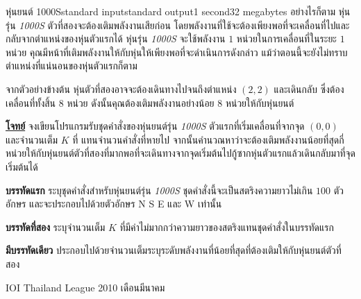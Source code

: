 \documentclass[11pt,a4paper]{article}
\begin{document}
\begin{problem}{หุ่นยนต์ 1000S}{standard input}{standard output}{1 second}{32 megabytes}
อย่างไรก็ตาม หุ่นรุ่น \textit{1000S} ตัวที่สองจะต้องเติมพลังงานเสียก่อน โดยพลังงานที่ใช้จะต้องเพียงพอที่จะเคลื่อนที่ไปและกลับจากตำแหน่งของหุ่นตัวแรกได้   หุ่นรุ่น \textit{1000S} จะใช้พลังงาน $1$ หน่วยในการเคลื่อนที่ในระยะ $1$ หน่วย   คุณมีหน้าที่เติมพลังงานให้กับหุ่นให้เพียงพอที่จะดำเนินการดังกล่าว แม้ว่าตอนนี้จะยังไม่ทราบตำแหน่งที่แน่นอนของหุ่นตัวแรกก็ตาม

จากตัวอย่างข้างต้น หุ่นตัวที่สองอาจจะต้องเดินทางไปจนถึงตำแหน่ง $(2,2)$ และเดินกลับ ซึ่งต้องเคลื่อนที่ทั้งสิ้น $8$ หน่วย ดังนั้นคุณต้องเติมพลังงานอย่างน้อย $8$ หน่วยให้กับหุ่นยนต์

\bigskip
\underline{\textbf{โจทย์}}  จงเขียนโปรแกรมรับชุดคำสั่งของหุ่นยนต์รุ่น \textit{1000S} ตัวแรกที่เริ่มเคลื่อนที่จากจุด $(0,0)$ และจำนวนเต็ม $K$ ที่ แทนจำนวนคำสั่งที่หายไป จากนั้นคำนวณหาว่าจะต้องเติมพลังงานน้อยที่สุดกี่หน่วยให้กับหุ่นยนต์ตัวที่สองที่มากพอที่จะเดินทางจากจุดเริ่มต้นไปกู้ซากหุ่นตัวแรกแล้วเดินกลับมาที่จุดเริ่มต้นได้


\InputFile

\textbf{บรรทัดแรก} ระบุชุดคำสั่งสำหรับหุ่นยนต์รุ่น \textit{1000S} ชุดคำสั่งนี้จะเป็นสตริงความยาวไม่เกิน $100$ ตัวอักษร และจะประกอบไปด้วยตัวอักษร N S E และ W เท่านั้น  

\textbf{บรรทัดที่สอง} ระบุจำนวนเต็ม $K$ ที่มีค่าไม่มากกว่าความยาวของสตริงแทนชุดคำสั่งในบรรทัดแรก


\OutputFile

\textbf{มีบรรทัดเดียว} ประกอบไปด้วยจำนวนเต็มระบุระดับพลังงานที่น้อยที่สุดที่ต้องเติมให้กับหุ่นยนต์ตัวที่สอง


\Examples

\begin{example}
%
%
%
\end{example}


\Source

 IOI Thailand League 2010 เดือนมีนาคม

\end{problem}
\end{document}
